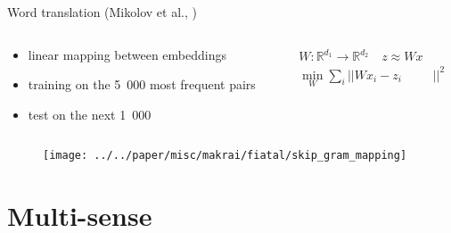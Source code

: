 \documentclass[10pt]{beamer}%
\newcommand{\Ro}{\mathbb{R}^{d_1}}
\newcommand{\Rt}{\mathbb{R}^{d_2}}
\begin{document}
\begin{frame} {Word translation (Mikolov et al., \citeyear{Mikolov:2013x})}
  \begin{columns}
    \begin{column}{.65\textwidth}
  \begin{itemize}
    \item linear mapping between embeddings 
    \item training on the 5~000 most frequent pairs  \\
    \item test on the next 1~000
  \end{itemize}
    \end{column}
    \begin{column}{.4\textwidth}
      \begin{align*}
        W : \Ro \rightarrow \Rt \quad z\approx Wx \\
        \min_W \sum_i || Wx_i - z_i &|| ^ 2
      \end{align*}
    \end{column}
  \end{columns}
    \begin{figure}
      \texttt{[image: ../../paper/misc/makrai/fiatal/skip\_gram\_mapping]}
    \end{figure}
\end{frame}

\section {Multi-sense}
\end{document}
